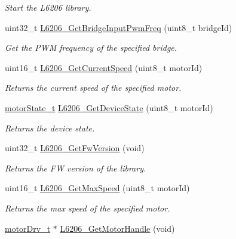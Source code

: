 \begin{DoxyCompactItemize}
\begin{DoxyCompactList}\small\item\em Start the L6206 library. \end{DoxyCompactList}\item 
uint32\+\_\+t \mbox{\hyperlink{group___l6206___exported___functions_ga96e17386e67b53504b3a175c6407552a}{L6206\+\_\+\+Get\+Bridge\+Input\+Pwm\+Freq}} (uint8\+\_\+t bridge\+Id)
\begin{DoxyCompactList}\small\item\em Get the P\+WM frequency of the specified bridge. \end{DoxyCompactList}\item 
uint16\+\_\+t \mbox{\hyperlink{group___l6206___exported___functions_gabfaed09fe6f8d2c74c0b78d2108fb83a}{L6206\+\_\+\+Get\+Current\+Speed}} (uint8\+\_\+t motor\+Id)
\begin{DoxyCompactList}\small\item\em Returns the current speed of the specified motor. \end{DoxyCompactList}\item 
\mbox{\hyperlink{group___device___states_ga9ba865be7705688e94f95a410e917a07}{motor\+State\+\_\+t}} \mbox{\hyperlink{group___l6206___exported___functions_ga133a25387b4a4a63e9c7544c5f3446f2}{L6206\+\_\+\+Get\+Device\+State}} (uint8\+\_\+t motor\+Id)
\begin{DoxyCompactList}\small\item\em Returns the device state. \end{DoxyCompactList}\item 
uint32\+\_\+t \mbox{\hyperlink{group___l6206___exported___functions_gad12aece8f24b63edc2e1fb7dc733a5a6}{L6206\+\_\+\+Get\+Fw\+Version}} (void)
\begin{DoxyCompactList}\small\item\em Returns the FW version of the library. \end{DoxyCompactList}\item 
uint16\+\_\+t \mbox{\hyperlink{group___l6206___exported___functions_gae656e681fb3c93267e8589d97d3cad8f}{L6206\+\_\+\+Get\+Max\+Speed}} (uint8\+\_\+t motor\+Id)
\begin{DoxyCompactList}\small\item\em Returns the max speed of the specified motor. \end{DoxyCompactList}\item 
\mbox{\hyperlink{structmotor_drv__t}{motor\+Drv\+\_\+t}} $\ast$ \mbox{\hyperlink{group___l6206___exported___functions_gaa149792f903cf325f24d8d4488d6c1c4}{L6206\+\_\+\+Get\+Motor\+Handle}} (void)

\end{DoxyCompactItemize}
